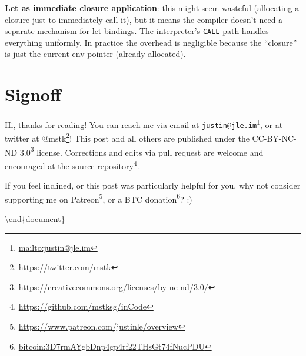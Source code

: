 \documentclass[]{article}
\renewcommand{\href}[2]{#2\footnote{\url{#1}}}
\begin{document}
\textbf{Let as immediate closure application}: this might seem wasteful
(allocating a closure just to immediately call it), but it means the compiler
doesn't need a separate mechanism for let-bindings. The interpreter's
\texttt{CALL} path handles everything uniformly. In practice the overhead is
negligible because the ``closure'' is just the current env pointer (already
allocated).

\section{Signoff}\label{signoff}

Hi, thanks for reading! You can reach me via email at
\href{mailto:justin@jle.im}{\nolinkurl{justin@jle.im}}, or at twitter at
\href{https://twitter.com/mstk}{@mstk}! This post and all others are published
under the \href{https://creativecommons.org/licenses/by-nc-nd/3.0/}{CC-BY-NC-ND
3.0} license. Corrections and edits via pull request are welcome and encouraged
at \href{https://github.com/mstksg/inCode}{the source repository}.

If you feel inclined, or this post was particularly helpful for you, why not
consider \href{https://www.patreon.com/justinle/overview}{supporting me on
Patreon}, or a \href{bitcoin:3D7rmAYgbDnp4gp4rf22THsGt74fNucPDU}{BTC donation}?
:)

\textbackslash end\{document\}
\end{document}
